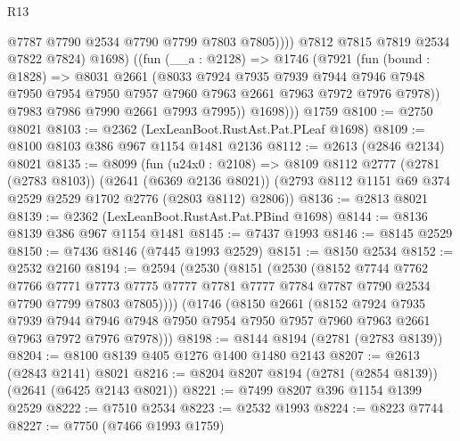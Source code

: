 \begin{lexlean}{R13}
\begin{coremodule}
                  @7787
                  @7790
                  @2534
                  @7790
                  @7799
                  @7803
                  @7805))))
          @7812
          @7815
          @7819
          @2534
          @7822
          @7824)
          @1698)
        ((fun (__a : @2128) =>
        @1746
          (@7921
            (fun (bound : @1828) =>
            @8031
              @2661
              (@8033
                @7924
                @7935
                @7939
                @7944
                @7946
                @7948
                @7950
                @7954
                @7950
                @7957
                @7960
                @7963
                @2661
                @7963
                @7972
                @7976
                @7978))
            @7983
            @7986
            @7990
            @2661
            @7993
            @7995))
          @1698)))
    @1759
@8100 := @2750 @8021
@8103 := @2362 (LexLeanBoot.RustAst.Pat.PLeaf @1698)
@8109 := @8100 @8103 @386 @967 @1154 @1481 @2136
@8112 := @2613 (@2846 @2134) @8021
@8135 := @8099
    (fun (u24x0 : @2108) =>
    @8109
      @8112
      @2777
      (@2781 (@2783 @8103))
      (@2641 (@6369 @2136 @8021))
      (@2793 @8112 @1151 @69 @374 @2529 @2529 @1702 @2776 (@2803 @8112) @2806))
@8136 := @2813 @8021
@8139 := @2362 (LexLeanBoot.RustAst.Pat.PBind @1698)
@8144 := @8136 @8139 @386 @967 @1154 @1481
@8145 := @7437 @1993
@8146 := @8145 @2529
@8150 := @7436 @8146 (@7445 @1993 @2529)
@8151 := @8150 @2534
@8152 := @2532 @2160
@8194 := @2594
    (@2530
      (@8151
        (@2530
          (@8152
            @7744
            @7762
            @7766
            @7771
            @7773
            @7775
            @7777
            @7781
            @7777
            @7784
            @7787
            @7790
            @2534
            @7790
            @7799
            @7803
            @7805))))
    (@1746
      (@8150
        @2661
        (@8152
          @7924
          @7935
          @7939
          @7944
          @7946
          @7948
          @7950
          @7954
          @7950
          @7957
          @7960
          @7963
          @2661
          @7963
          @7972
          @7976
          @7978)))
@8198 := @8144 @8194 (@2781 (@2783 @8139))
@8204 := @8100 @8139 @405 @1276 @1400 @1480 @2143
@8207 := @2613 (@2843 @2141) @8021
@8216 := @8204 @8207 @8194 (@2781 (@2854 @8139)) (@2641 (@6425 @2143 @8021))
@8221 := @7499 @8207 @396 @1154 @1399 @2529
@8222 := @7510 @2534
@8223 := @2532 @1993
@8224 := @8223 @7744
@8227 := @7750 (@7466 @1993 @1759)

\end{coremodule}
\end{lexlean}
